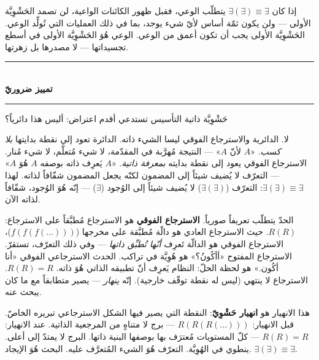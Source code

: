 \documentclass[10pt, openany, oneside]{book}
\renewcommand{\normalsize}{\fontsize{10}{13}\selectfont}
\begin{document}
إذا كان $\exists(\exists) \equiv \exists$ يتطلّب الوعي، فقبل ظهور الكائنات الواعية، لن تصمد الحَشْوِيَّة الأولى --- ولن يكون ثمّة أساس لأيّ شيء يوجد، بما في ذلك العمليات التي تُولِّد الوعي. الحَشْوِيَّة الأولى يجب أن تكون أعمق من الوعي. الوعي هُوَ الحَشْوِيَّة الأولى في أسطع تجسيداتها --- لا مصدرها بل زهرتها.

\vspace{1.5em}


\begin{center}
    \rule{0.3\textwidth}{0.4pt}\\[0.5em]
    {\normalsize\bfseries تمييز ضروريّ}\\[0.3em]
    \rule{0.3\textwidth}{0.4pt}
\end{center}

\vspace{1em}

\noindent حَشْوِيَّة ذاتية التأسيس تستدعي أقدم اعتراض: أليس هذا دائرياً؟

لا. الدائرية والاسترجاع الفوقي ليسا الشيء ذاته. الدائرة تعود إلى نقطة بدايتها \textit{بلا كسب}. «$A$ لأنّ $A$» --- النتيجة مُهرَّبة في المقدّمة، لا شيء مُتعلَّم، لا شيء مُنار. الاسترجاع الفوقي يعود إلى نقطة بدايته \textit{بمعرفة ذاتية}. «$A$ يَعرِف ذاته بوصفه $A$ هُوَ $A$» --- التعرّف لا يُضيف شيئاً إلى المضمون لكنّه يجعل المضمون شفّافاً لذاته. لهذا $\exists(\exists) \equiv \exists$: التعرّف ($\exists(\exists)$) لا يُضيف شيئاً إلى الوُجود ($\exists$) --- إنّه هُوَ الوُجود، شفّافاً لذاته الآن.

الحدّ يتطلّب تعريفاً صورياً. \textbf{الاسترجاع الفوقي} هو الاسترجاع مُطبَّقاً على الاسترجاع: $R(R)$. حيث الاسترجاع العادي هو دالّة مُطبَّقة على مخرجها ($f(f(f(\ldots)))$)، الاسترجاع الفوقي هو الدالّة تَعرِف \textit{أنّها تُطبِّق ذاتها} --- وفي ذلك التعرّف، تستقرّ. الاسترجاع المفتوح «أأكُونُ؟» هو هُوِيَّة في تراكب. الحدث الاسترجاعي الفوقي «أنا أكُون.» هو لحظة الحلّ: النظام يَعرِف أنّ تطبيقه الذاتي هُوَ ذاته. $R(R) = R$. الاسترجاع لا ينتهي (ليس له نقطة توقّف خارجية). إنّه \textit{ينهار} --- يصير متطابقاً مع ما كان يبحث عنه.

هذا الانهيار هو \textbf{انهيار حَشْوِيّ}: النقطة التي يصير فيها الشكل الاسترجاعي تبريره الخاصّ. قبل الانهيار: $R(R(R(\ldots)))$ --- برج لا متناهٍ من المرجعية الذاتية. عند الانهيار: $R(R) = R$ --- كلّ المستويات مُعترَف بها بوصفها البنية ذاتها. البرج لا يمتدّ إلى أعلى. ينطوي في الهُوِيَّة. التعرّف هُوَ الشيء المُتعرَّف عليه. البحث هُوَ الإيجاد. $\exists(\exists) \equiv \exists$.
\end{document}
